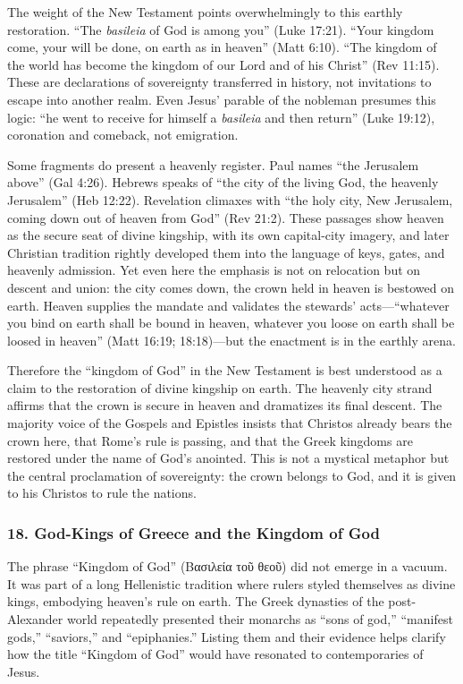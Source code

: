 The weight of the New Testament points overwhelmingly to this earthly restoration.
“The \emph{basileia} of God is among you” (Luke 17:21).
“Your kingdom come, your will be done, on earth as in heaven” (Matt 6:10).
“The kingdom of the world has become the kingdom of our Lord and of his Christ” (Rev 11:15).
These are declarations of sovereignty transferred in history, not invitations to escape into another realm.
Even Jesus’ parable of the nobleman presumes this logic: “he went to receive for himself a \emph{basileia} and then return” (Luke 19:12), coronation and comeback, not emigration.

Some fragments do present a heavenly register.
Paul names “the Jerusalem above” (Gal 4:26).
Hebrews speaks of “the city of the living God, the heavenly Jerusalem” (Heb 12:22).
Revelation climaxes with “the holy city, New Jerusalem, coming down out of heaven from God” (Rev 21:2).
These passages show heaven as the secure seat of divine kingship, with its own capital-city imagery, and later Christian tradition rightly developed them into the language of keys, gates, and heavenly admission.
Yet even here the emphasis is not on relocation but on descent and union: the city comes down, the crown held in heaven is bestowed on earth.
Heaven supplies the mandate and validates the stewards’ acts—“whatever you bind on earth shall be bound in heaven, whatever you loose on earth shall be loosed in heaven” (Matt 16:19; 18:18)—but the enactment is in the earthly arena.

Therefore the “kingdom of God” in the New Testament is best understood as a claim to the restoration of divine kingship on earth.
The heavenly city strand affirms that the crown is secure in heaven and dramatizes its final descent.
The majority voice of the Gospels and Epistles insists that Christos already bears the crown here, that Rome’s rule is passing, and that the Greek kingdoms are restored under the name of God’s anointed.
This is not a mystical metaphor but the central proclamation of sovereignty: the crown belongs to God, and it is given to his Christos to rule the nations.

\subsubsection{18. God-Kings of Greece and the Kingdom of God}\label{subsubsec:god-kings-of-greece-and-the-kingdom-of-god}
The phrase “Kingdom of God” (\textgreek{Βασιλεία τοῦ θεοῦ}) did not emerge in a vacuum.
It was part of a long Hellenistic tradition where rulers styled themselves as divine kings, embodying heaven’s rule on earth.
The Greek dynasties of the post-Alexander world repeatedly presented their monarchs as “sons of god,” “manifest gods,” “saviors,” and “epiphanies.”
Listing them and their evidence helps clarify how the title “Kingdom of God” would have resonated to contemporaries of Jesus.

